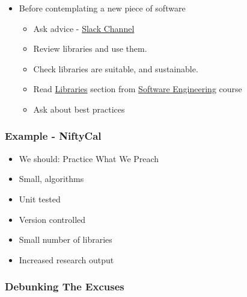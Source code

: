 \begin{itemize}
\itemsep1pt\parskip0pt
\item
  Before contemplating a new piece of software

  \begin{itemize}
  \itemsep1pt\parskip0pt
  \item
    Ask advice - \href{https://ucl-programming-hub.slack.com/}{Slack
    Channel}
  \item
    Review libraries and use them.
  \item
    Check libraries are suitable, and sustainable.
  \item
    Read
    \href{http://development.rc.ucl.ac.uk/training/engineering/ch04packaging/01Libraries.html}{Libraries}
    section from
    \href{http://github-pages.ucl.ac.uk/rsd-engineeringcourse/}{Software
    Engineering} course
  \item
    Ask about best practices
  \end{itemize}
\end{itemize}

\subsubsection{Example - NiftyCal}\label{example---niftycal}

\begin{itemize}
\itemsep1pt\parskip0pt
\item
  We should: Practice What We Preach
\item
  Small, algorithms
\item
  Unit tested
\item
  Version controlled
\item
  Small number of libraries
\item
  Increased research output
\end{itemize}

\subsubsection{Debunking The Excuses}\label{debunking-the-excuses}

